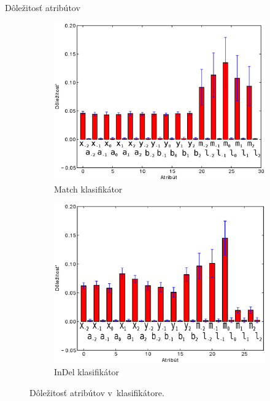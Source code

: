 \documentclass[xcolor=dvipsnames, compress, 12pt]{beamer}
\theoremstyle{definition}
\begin{document}
\begin{frame}{Dôležitosť atribútov}
\begin{figure}[h]
        \centering
        \begin{subfigure}[b]{0.45\textwidth}
                \includegraphics[width=\textwidth]{images/randomforest_combined_5_bars}
                \caption{Match klasifikátor}
        \end{subfigure}%
        \qquad %
        \begin{subfigure}[b]{0.45\textwidth}
                \includegraphics[width=\textwidth]{images/randomforest_combined_5_indel_bars}
                \caption{InDel klasifikátor}
        \end{subfigure}
        \caption{Dôležitosť atribútov v~klasifikátore.}
\end{figure}
\end{frame}
\end{document}
